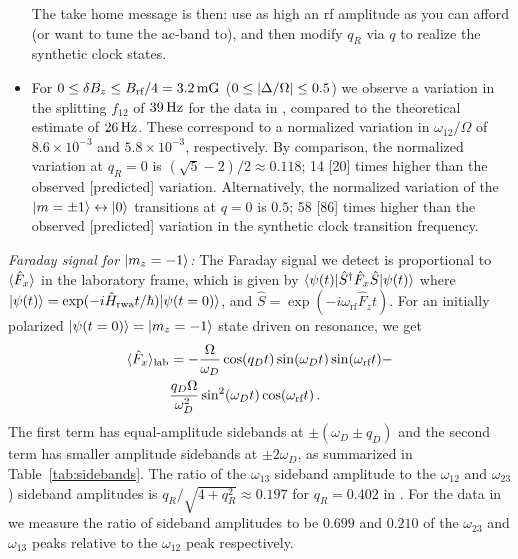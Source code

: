 \documentclass[aps,prl,reprint,superscriptaddress,floatfix]{revtex4-1}
\begin{document}
\begin{itemize}
    The take home message is then: use as high an rf amplitude as you can afford (or want to tune the ac-band to), and then modify $q_R$ via $q$ to realize the synthetic clock states.
    \item[\checkmark] For $0 \leq \delta B_z \leq B_{\text{rf}}/4 = \unit[3.2]{mG}$ ($0 \leq \vert \Delta/\Omega \vert  \leq 0.5$) we observe a variation in the splitting $f_{12}$ of $\unit[39]{Hz}$ for the data in , compared to the theoretical estimate of $\unit[26]{Hz}$.
    These correspond to a normalized variation in $\omega_{12}/\Omega$ of $8.6\times10^{-3}$ and $5.8\times10^{-3}$, respectively.
    By comparison, the normalized variation at $q_R=0$ is $(\sqrt{5}-2)/2 \approx 0.118$; 14 [20] times higher than the observed [predicted] variation.
    Alternatively, the normalized variation of the $\vert m=\pm1 \rangle  \leftrightarrow \vert 0 \rangle $ transitions at $q=0$ is $0.5$; 58 [86] times higher than the observed [predicted] variation in the synthetic clock transition frequency.
\end{itemize}

\textit{Faraday signal for $\vert m_z=-1 \rangle $:}
The Faraday signal we detect is proportional to $\langle \hat{F}_x \rangle$ in the laboratory frame, which is given by $\langle \psi(t) \vert \hat{S}^{\dagger} \hat{F}_x \hat{S} \vert \psi(t) \rangle $ where $\vert \psi(t) \rangle  = \exp(-i \hat{H}_{\text{rwa}} t/\hbar) \vert \psi(t=0) \rangle $, and $\hat{S} = \exp(-i \omega_{\text{rf}} \hat{F}_z t)$.
For an initially polarized $\vert \psi(t=0) \rangle  = \vert m_z=-1 \rangle $ state driven on resonance, we get
    \begin{align*}
        \langle \hat{F}_x \rangle_{\text{lab}} &= -\frac{\Omega}{\omega_D} \cos(q_D t) \sin(\omega_D t) \sin(\omega_{\text{rf}} t) - \\ &\frac{q_D \Omega}{\omega_D^2} \sin^2(\omega_D t) \cos(\omega_{\text{rf}} t) \, .
    \end{align*}
The first term has equal-amplitude sidebands at $\pm(\omega_D \pm q_D)$ and the second term has smaller amplitude sidebands at $\pm 2\omega_D$, as summarized in Table~\ref{tab:sidebands}.
The ratio of the $\omega_{13}$ sideband amplitude to the $\omega_{12}$ and $\omega_{23}$) sideband amplitudes is $q_R/\sqrt{4+q_R^2} \approx 0.197$ for $q_R = 0.402$ in .
For the data in  we measure the ratio of sideband amplitudes to be $0.699$ and $0.210$ of the $\omega_{23}$ and $\omega_{13}$ peaks relative to the $\omega_{12}$ peak respectively.
\end{document}
